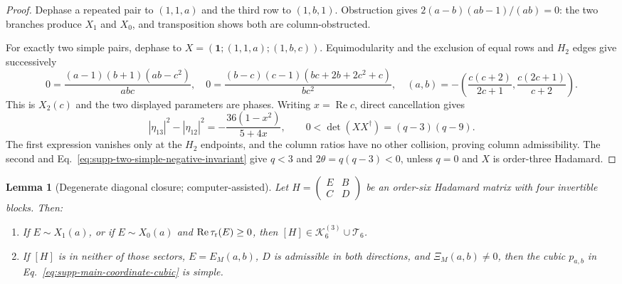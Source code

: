 \documentclass[aps,prx,reprint,nofootinbib,twoside,superscriptaddress,longbibliography,floatfix]{revtex4-2}
\newtheorem{lemma}[theorem]{Lemma}
\theoremstyle{definition}
\newcommand{\C}{\mathbb C}
\newcommand{\KK}{\mathcal K}
\newcommand{\RePart}{\operatorname{Re}}
\begin{document}
\begin{proof}
{Dephase a repeated pair to $(1,1,a)$ and the third row to $(1,b,1)$.  Obstruction gives $2(a-b)(ab-1)/(ab)=0$: the two branches produce $X_1$ and $X_0$, and transposition shows both are column-obstructed.}

{For exactly two simple pairs, dephase to $X=(\mathbf1;(1,1,a);(1,b,c))$.  Equimodularity and the exclusion of equal rows and $H_2$ edges give successively}
\begin{equation}
{0=\frac{(a-1)(b+1)(ab-c^2)}{abc},\quad
0=\frac{(b-c)(c-1)(bc+2b+2c^2+c)}{bc^2},\quad
(a,b)=-\left(\frac{c(c+2)}{2c+1},\frac{c(2c+1)}{c+2}\right).}
\end{equation}
{This is $X_2(c)$ and the two displayed parameters are phases.  Writing $x=\RePart c$, direct cancellation gives}
\begin{equation}
{|\eta_{13}|^2-|\eta_{12}|^2=-\frac{36(1-x^2)}{5+4x},\qquad
0<\det(XX^\dagger)=(q-3)(q-9).}
\end{equation}
{The first expression vanishes only at the $H_2$ endpoints, and the column ratios have no other collision, proving column admissibility.  The second and Eq.~\eqref{eq:supp-two-simple-negative-invariant} give $q<3$ and $2\theta=q(q-3)<0$, unless $q=0$ and $X$ is order-three Hadamard.}
\end{proof}

\begin{lemma}[{Degenerate diagonal closure; computer-assisted}]
\label{lem:supp-degenerate-diagonal-closure}
{Let $H=\left(\begin{smallmatrix}E&B\\C&D\end{smallmatrix}\right)$ be an order-six Hadamard matrix with four invertible blocks. Then:}
\begin{enumerate}
\item {If $E\sim X_1(a)$, or if $E\sim X_0(a)$ and $\RePart\tau_{\rm r}(E)\ge0$, then $[H]\in\KK_6^{(3)}\cup\mathcal T_6$.}
\item {If $[H]$ is in neither of those sectors, $E=E_M(a,b)$, $D$ is admissible in both directions, and $\Xi_M(a,b)\ne0$, then the cubic $p_{a,b}$ in Eq.~\eqref{eq:supp-main-coordinate-cubic} is simple.}
\end{enumerate}
\end{lemma}
\end{document}
